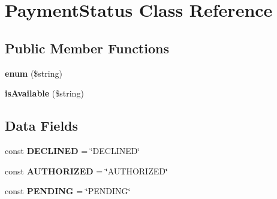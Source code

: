 \hypertarget{class_payment_status}{\section{Payment\+Status Class Reference}
\label{class_payment_status}
}
\subsection*{Public Member Functions}
\begin{DoxyCompactItemize}
\item 
\hypertarget{class_payment_status_a7967c6e825979f8b2faefba3d95c3821}{{\bfseries enum} (\$string)}\label{class_payment_status_a7967c6e825979f8b2faefba3d95c3821}

\item 
\hypertarget{class_payment_status_a30537daeb912ea3e348c579c4f930841}{{\bfseries is\+Available} (\$string)}\label{class_payment_status_a30537daeb912ea3e348c579c4f930841}

\end{DoxyCompactItemize}
\subsection*{Data Fields}
\begin{DoxyCompactItemize}
\item 
\hypertarget{class_payment_status_af0e3a2596ff8af1e988f1f0e7dfc3ab3}{const {\bfseries D\+E\+C\+L\+I\+N\+E\+D} = \char`\"{}D\+E\+C\+L\+I\+N\+E\+D\char`\"{}}\label{class_payment_status_af0e3a2596ff8af1e988f1f0e7dfc3ab3}

\item 
\hypertarget{class_payment_status_a733cdce623d01b4164a01652375bc7e4}{const {\bfseries A\+U\+T\+H\+O\+R\+I\+Z\+E\+D} = \char`\"{}A\+U\+T\+H\+O\+R\+I\+Z\+E\+D\char`\"{}}\label{class_payment_status_a733cdce623d01b4164a01652375bc7e4}

\item 
\hypertarget{class_payment_status_abaf4facc752f618f7d88aa7e2886c812}{const {\bfseries P\+E\+N\+D\+I\+N\+G} = \char`\"{}P\+E\+N\+D\+I\+N\+G\char`\"{}}\label{class_payment_status_abaf4facc752f618f7d88aa7e2886c812}

\end{DoxyCompactItemize}
